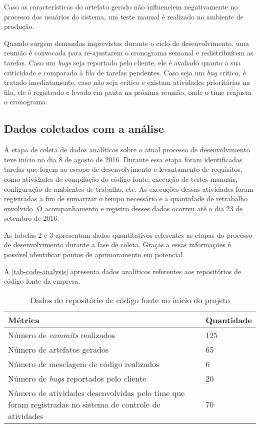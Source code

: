 \documentclass[
	12pt,				%
	openright,			%
	oneside,			%
	a4paper,			%
	english,			%
	french,				%
	spanish,			%
	brazil,				%
	]{abntex2}
\begin{document}
Caso as características do artefato gerado não influenciem negativamente no processo dos usuários do sistema, um teste manual é realizado no ambiente de produção.

Quando surgem demandas imprevistas durante o ciclo de desenvolvimento, uma reunião é convocada para re-ajustarem o cronograma semanal e redistribuírem as tarefas. Caso um \textit{bugs} seja reportado pelo cliente, ele é avaliado quanto a sua criticidade e comparado à fila de tarefas pendentes. Caso seja um \textit{bug} crítico, é tratado imediatamente, caso não seja critico e existam atividades prioritárias na fila, ele é registrado e levado em pauta na próxima reunião, onde o time reajusta o cronograma.

\subsection{Dados coletados com a análise}

A etapa de coleta de dados analíticos sobre o atual processo de desenvolvimento teve início no dia 8 de agosto de 2016. Durante essa etapa foram identificadas tarefas que fogem ao escopo de desenvolvimento e levantamento de requisitos, como atividades de compilação do código fonte, execução de testes manuais, configuração de ambientes de trabalho, etc. As execuções dessas atividades foram registradas a fim de sumarizar o tempo necessário e a quantidade de retrabalho envolvido. O acompanhamento e registro desses dados ocorreu até o dia 23 de setembro de 2016.

As tabelas 2 e 3 apresentam dados quantitativos referentes as etapas do processo de desenvolvimento durante a fase de coleta. Graças a essas informações é possível identificar pontos de aprimoramento em potencial.

A \autoref{tab-code-analysis} apresenta dados analíticos referentes aos repositórios de código fonte da empresa.

\begin{table}[htb]
	\caption{Dados do repositório de código fonte no início do projeto}
	
	\label{tab-code-analysis}	
	\begin{tabular}{p{7.15cm}|p{7.10cm}}
		\textbf{Métrica} & \textbf{Quantidade}  \\
		\hline
		Número de \textit{commits} realizados & 125 \\
		\hline
		Número de artefatos gerados & 65 \\
		\hline
		Número de mesclagem de código realizados & 6 \\
		\hline
		Número de \textit{bugs} reportados pelo cliente & 20 \\
		\hline
		Número de atividades desenvolvidas pelo time que foram registradas no sistema de controle de atividades & 70 \\
	\end{tabular}
\end{table}
\end{document}
